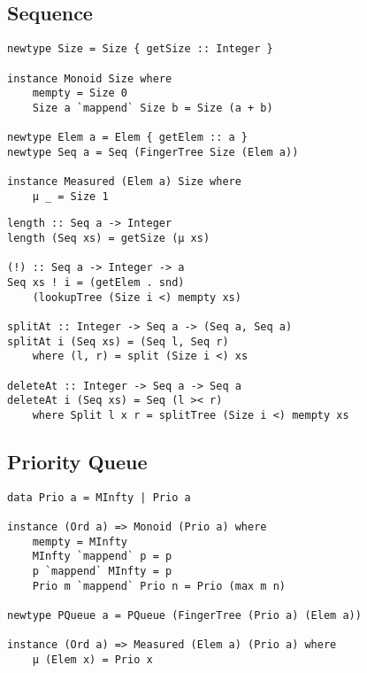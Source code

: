 \subsection{Sequence}

\begin{frame}[fragile]
\begin{verbatim}
newtype Size = Size { getSize :: Integer }

instance Monoid Size where
    mempty = Size 0
    Size a `mappend` Size b = Size (a + b)
    
newtype Elem a = Elem { getElem :: a }
newtype Seq a = Seq (FingerTree Size (Elem a))

instance Measured (Elem a) Size where
    μ _ = Size 1
\end{verbatim}
\end{frame}

\begin{frame}[fragile]
\begin{verbatim}
length :: Seq a -> Integer
length (Seq xs) = getSize (μ xs)

(!) :: Seq a -> Integer -> a
Seq xs ! i = (getElem . snd)
    (lookupTree (Size i <) mempty xs)

splitAt :: Integer -> Seq a -> (Seq a, Seq a)
splitAt i (Seq xs) = (Seq l, Seq r)
    where (l, r) = split (Size i <) xs

deleteAt :: Integer -> Seq a -> Seq a
deleteAt i (Seq xs) = Seq (l >< r)
    where Split l x r = splitTree (Size i <) mempty xs
\end{verbatim}
\end{frame}

\subsection{Priority Queue}

\begin{frame}[fragile]
\begin{verbatim}
data Prio a = MInfty | Prio a

instance (Ord a) => Monoid (Prio a) where
    mempty = MInfty
    MInfty `mappend` p = p
    p `mappend` MInfty = p
    Prio m `mappend` Prio n = Prio (max m n)

newtype PQueue a = PQueue (FingerTree (Prio a) (Elem a))

instance (Ord a) => Measured (Elem a) (Prio a) where
    μ (Elem x) = Prio x
\end{verbatim}
\end{frame}

